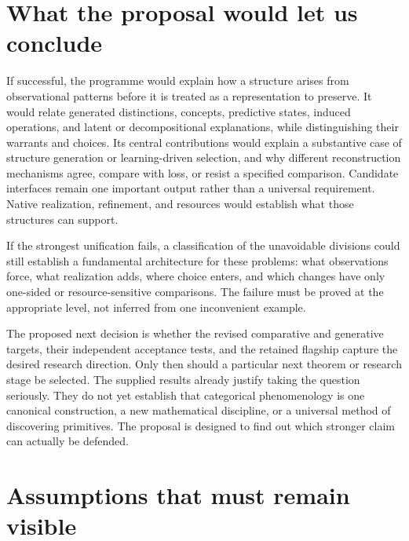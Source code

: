 \documentclass[11pt]{article}
\theoremstyle{remark}
\begin{document}
\section{What the proposal would let us conclude}
\label{sec:conclusion}

If successful, the programme would explain how a structure arises from observational patterns before it is treated as a representation to preserve. It would relate generated distinctions, concepts, predictive states, induced operations, and latent or decompositional explanations, while distinguishing their warrants and choices. Its central contributions would explain a substantive case of structure generation or learning-driven selection, and why different reconstruction mechanisms agree, compare with loss, or resist a specified comparison. Candidate interfaces remain one important output rather than a universal requirement. Native realization, refinement, and resources would establish what those structures can support.

If the strongest unification fails, a classification of the unavoidable divisions could still establish a fundamental architecture for these problems: what observations force, what realization adds, where choice enters, and which changes have only one-sided or resource-sensitive comparisons. The failure must be proved at the appropriate level, not inferred from one inconvenient example.

The proposed next decision is whether the revised comparative and generative targets, their independent acceptance tests, and the retained flagship capture the desired research direction. Only then should a particular next theorem or research stage be selected. The supplied results already justify taking the question seriously. They do not yet establish that categorical phenomenology is one canonical construction, a new mathematical discipline, or a universal method of discovering primitives. The proposal is designed to find out which stronger claim can actually be defended.

\appendix
\section{Assumptions that must remain visible}
\label{app:assumptions}
\end{document}
